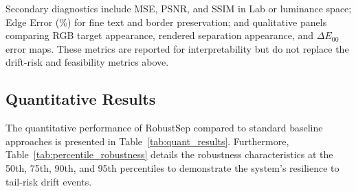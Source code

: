 \documentclass[11pt]{article}
\begin{document}
Secondary diagnostics include MSE, PSNR, and SSIM in Lab or luminance space; Edge Error (\%) for fine text and border preservation; and qualitative panels comparing RGB target appearance, rendered separation appearance, and $\Delta E_{00}$ error maps. These metrics are reported for interpretability but do not replace the drift-risk and feasibility metrics above.

\subsection{Quantitative Results}

The quantitative performance of RobustSep compared to standard baseline approaches is presented in Table~\ref{tab:quant_results}. Furthermore, Table~\ref{tab:percentile_robustness} details the robustness characteristics at the 50th, 75th, 90th, and 95th percentiles to demonstrate the system's resilience to tail-risk drift events.
\end{document}
